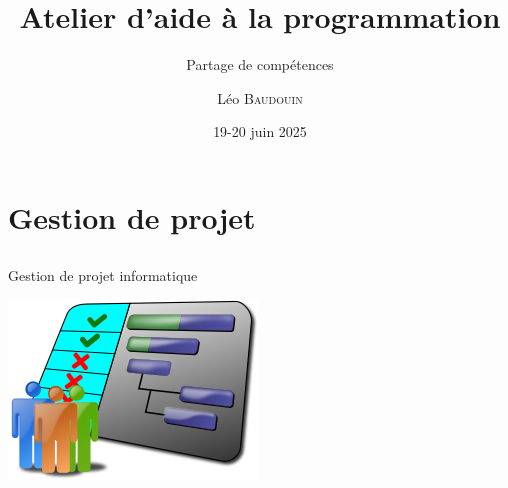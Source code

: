 \documentclass{beamer}
\title{Atelier d'aide à la programmation}
\subtitle{Partage de compétences}
\author{L\'eo \textsc{Baudouin}}
\institute{
  {\url{baudouin.leo @ gmail.com}}
}
\date{19-20 juin 2025}
\begin{document}
\begin{frame}
  \titlepage
\end{frame}




\section{Gestion de projet}
\subsection{}

\begin{frame}{Gestion de projet informatique}
\begin{center}
\includegraphics[width=0.5\linewidth]{images/project}

\end{center}
\end{frame}
\end{document}
